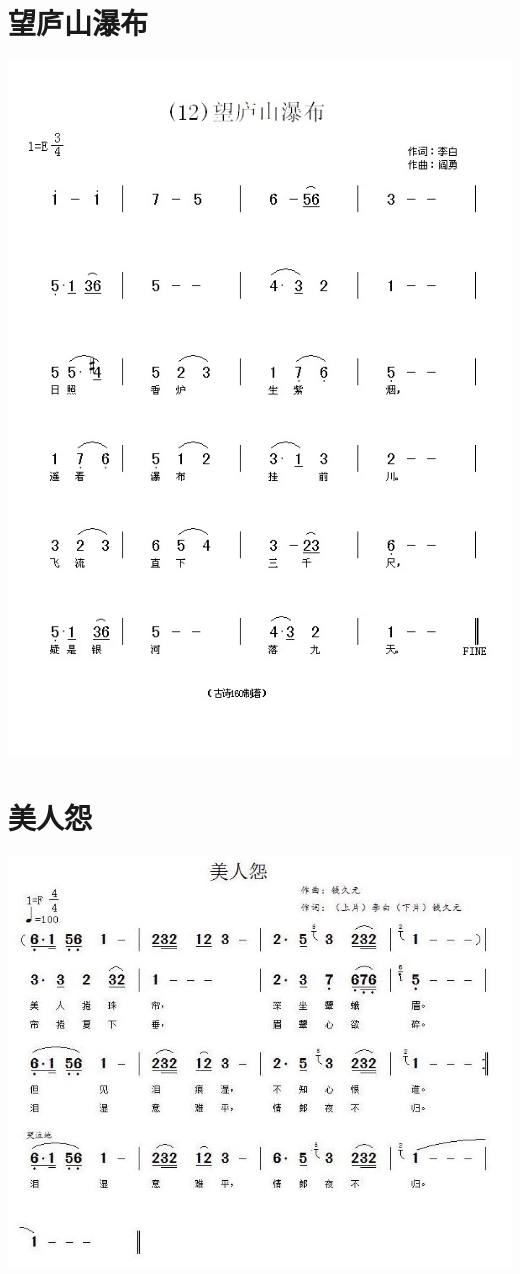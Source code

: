 \documentclass[cn,pad,twocol]{elegantbook}
\begin{document}
\section{望庐山瀑布}\includegraphics[width=\textwidth]{dongxiao/20200808-望庐山瀑布-李白.jpg}
\section{美人怨}    \includegraphics[width=\textwidth]{dongxiao/20200808-美人怨-李白.jpg}
\end{document}
